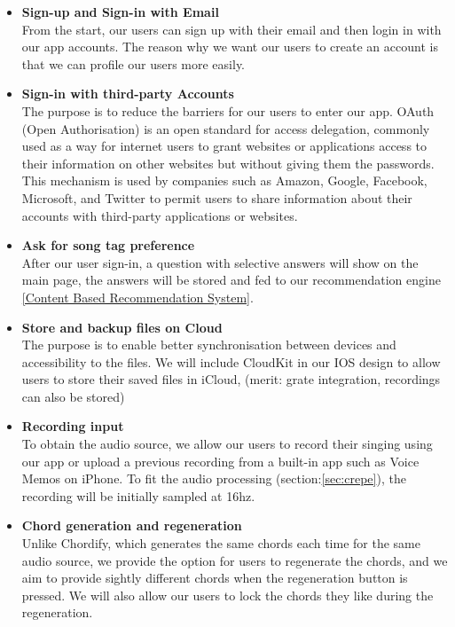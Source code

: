 \begin{itemize}

\item \textbf{Sign-up and Sign-in with Email}
\\From the start, our users can sign up with their email and then login in with our app accounts. The reason why we want our users to create an account is that we can profile our users more easily.

\item \textbf{Sign-in with third-party Accounts}
\\ The purpose is to reduce the barriers for our users to enter our app. OAuth (Open Authorisation) is an open standard for access delegation, commonly used as a way for internet users to grant websites or applications access to their information on other websites but without giving them the passwords. This mechanism is used by companies such as Amazon, Google, Facebook, Microsoft, and Twitter to permit users to share information about their accounts with third-party applications or websites.

\item \textbf{Ask for song tag preference}
\\After our user sign-in, a question with selective answers will show on the main page, the answers will be stored and fed to our recommendation engine \autoref{Content Based Recommendation System}.

\item \textbf{Store and backup files on Cloud}
\\The purpose is to enable better synchronisation between devices and accessibility to the files. 
We will include CloudKit in our IOS design to allow users to store their saved files in iCloud, (merit: grate integration, recordings can also be stored)

\item \textbf{Recording input}
\\ To obtain the audio source, we allow our users to record their singing using our app or upload a previous recording 
from a built-in app such as Voice Memos on iPhone. To fit the audio processing (section:\ref{sec:crepe}), the recording will be initially sampled at 16hz.

\item \textbf{Chord generation and regeneration}
\\Unlike Chordify, which generates the same chords each time for the same audio source, we provide the option for users to regenerate the chords, and we aim to provide sightly different chords when the regeneration button is pressed. 
We will also allow our users to lock the chords they like during the regeneration.


\end{itemize}
